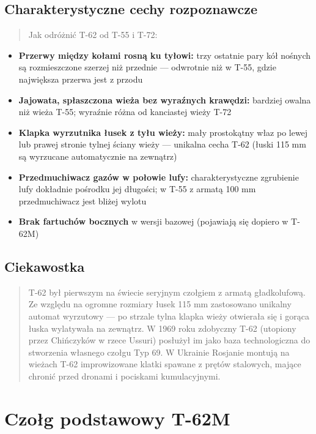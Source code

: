 \documentclass[12pt,oneside]{book}
\providecommand{\tightlist}{%
  \setlength{\itemsep}{0pt}\setlength{\parskip}{0pt}}
\begin{document}
\subsection{Charakterystyczne cechy
rozpoznawcze}\label{charakterystyczne-cechy-rozpoznawcze-1}

\begin{quote}
Jak odróżnić T-62 od T-55 i T-72:
\end{quote}

\begin{itemize}
\tightlist
\item
  \textbf{Przerwy między kołami rosną ku tyłowi:} trzy ostatnie pary kół
  nośnych są rozmieszczone szerzej niż przednie --- odwrotnie niż w
  T-55, gdzie największa przerwa jest z przodu
\item
  \textbf{Jajowata, spłaszczona wieża bez wyraźnych krawędzi:} bardziej
  owalna niż wieża T-55; wyraźnie różna od kanciastej wieży T-72
\item
  \textbf{Klapka wyrzutnika łusek z tyłu wieży:} mały prostokątny właz
  po lewej lub prawej stronie tylnej ściany wieży --- unikalna cecha
  T-62 (łuski 115 mm są wyrzucane automatycznie na zewnątrz)
\item
  \textbf{Przedmuchiwacz gazów w połowie lufy:} charakterystyczne
  zgrubienie lufy dokładnie pośrodku jej długości; w T-55 z armatą 100
  mm przedmuchiwacz jest bliżej wylotu
\item
  \textbf{Brak fartuchów bocznych} w wersji bazowej (pojawiają się
  dopiero w T-62M)
\end{itemize}

\subsection{Ciekawostka}\label{ciekawostka-1}

\begin{quote}
T-62 był pierwszym na świecie seryjnym czołgiem z armatą gładkolufową.
Ze względu na ogromne rozmiary łusek 115 mm zastosowano unikalny automat
wyrzutowy --- po strzale tylna klapka wieży otwierała się i gorąca łuska
wylatywała na zewnątrz. W 1969 roku zdobyczny T-62 (utopiony przez
Chińczyków w rzece Ussuri) posłużył im jako baza technologiczna do
stworzenia własnego czołgu Typ 69. W Ukrainie Rosjanie montują na
wieżach T-62 improwizowane klatki spawane z prętów stalowych, mające
chronić przed dronami i pociskami kumulacyjnymi.
\end{quote}

\section{Czołg podstawowy T-62M}\label{czoux142g-podstawowy-t-62m}
\end{document}
